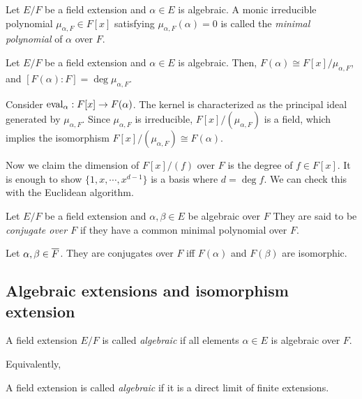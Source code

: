 \documentclass{../exp}
\begin{document}
\begin{defn}
Let $E/F$ be a field extension and $\alpha\in E$ is algebraic.
A monic irreducible polynomial $\mu_{\alpha,F}\in F[x]$ satisfying $\mu_{\alpha,F}(\alpha)=0$ is called the \emph{minimal polynomial} of $\alpha$ over $F$.
\end{defn}

\begin{thm}
Let $E/F$ be a field extension and $\alpha\in E$ is algebraic.
Then, $F(\alpha)\cong F[x]/\mu_{\alpha,F}$, and $[F(\alpha):F]=\deg\mu_{\alpha,F}$.
\end{thm}
\begin{pf}
Consider $\eval_\alpha:F[x]\to F(\alpha)$.
The kernel is characterized as the principal ideal generated by $\mu_{\alpha,F}$.
Since $\mu_{\alpha,F}$ is irreducible, $F[x]/(\mu_{\alpha,F})$ is a field, which implies the isomorphism $F[x]/(\mu_{\alpha,F})\cong F(\alpha)$.

Now we claim the dimension of $F[x]/(f)$ over $F$ is the degree of $f\in F[x]$.
It is enough to show $\{1,x,\cdots,x^{d-1}\}$ is a basis where $d=\deg f$.
We can check this with the Euclidean algorithm.
\end{pf}


\begin{defn}
Let $E/F$ be a field extension and $\alpha,\beta\in E$ be algebraic over $F$
They are said to be \emph{conjugate over $F$} if they have a common minimal polynomial over $F$.
\end{defn}

\begin{thm}
Let  $\alpha,\beta\in\overline F$.
They are conjugates over $F$ iff $F(\alpha)$ and $F(\beta)$ are isomorphic.
\end{thm}
\begin{pf}
\end{pf}






\subsection{Algebraic extensions and isomorphism extension}

\begin{defn}
A field extension $E/F$ is called \emph{algebraic} if all elements $\alpha\in E$ is algebraic over $F$.
\end{defn}

Equivalently,
\begin{defn}
A field extension is called \emph{algebraic} if it is a direct limit of finite extensions.
\end{defn}
\end{document}
